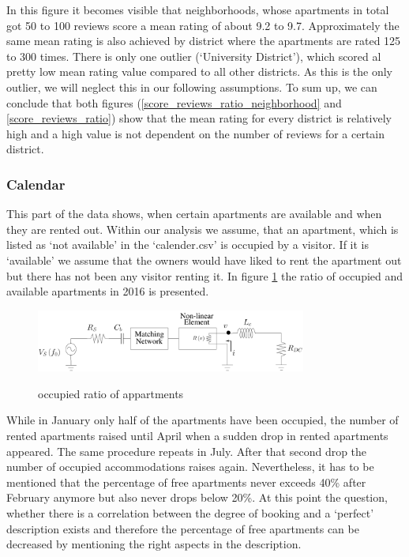 In this figure it becomes visible that neighborhoods, whose apartments in total got 50 to 100 reviews score a mean rating of about 9.2 to 9.7. Approximately the same mean rating is also achieved by district where the apartments are rated 125 to 300 times. There is only one outlier (‘University District’), which scored al pretty low mean rating value compared to all other districts. As this is the only outlier, we will neglect this in our following assumptions.
To sum up, we can conclude that both figures (\ref{score_reviews_ratio_neighborhood} and \ref{score_reviews_ratio}) show that the mean rating for every district is relatively high and a high value is not dependent on the number of reviews for a certain district.
\subsubsection{Calendar}
This part of the data shows, when certain apartments are available and when they are rented out. Within our analysis we assume, that an apartment, which is listed as ‘not available’ in the ‘calender.csv’ is occupied by a visitor. If it is ‘available’ we assume that the owners would have liked to rent the apartment out but there has not been any visitor renting it. In figure \ref{occupied_ratio_of_appartments} the ratio of occupied and available apartments in 2016 is presented.
\begin{figure}
  \begin{center}
  \includegraphics[width=3.5in]{pdf/01.pdf}\\
  \caption{occupied ratio of appartments}\label{occupied_ratio_of_appartments}
  \end{center}
\end{figure}

While in January only half of the apartments have been occupied, the number of rented apartments raised until April when a sudden drop in rented apartments appeared. The same procedure repeats in July. After that second drop the number of occupied accommodations raises again. Nevertheless, it has to be mentioned that the percentage of free apartments never exceeds 40\% after February anymore but also never drops below 20\%. At this point the question, whether there is a correlation between the degree of booking and a ‘perfect’ description exists and therefore the percentage of free apartments can be decreased by mentioning the right aspects in the description. 


